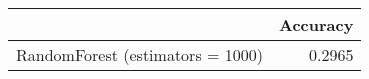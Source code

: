\begin{tabular}{lr}
\toprule
{} &  Accuracy \\
\midrule
RandomForest (estimators = 1000) &    0.2965 \\
\bottomrule
\end{tabular}
